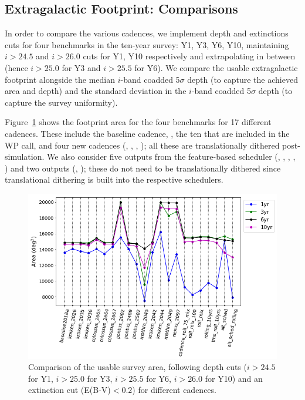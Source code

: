 \subsection{Extragalactic Footprint: Comparisons}
In order to compare the various cadences, we implement depth and extinctions cuts for four benchmarks in the ten-year survey: Y1, Y3, Y6, Y10, maintaining $i>24.5$ and $i>26.0$ cuts for Y1, Y10 respectively and extrapolating in between (hence $i>25.0$  for Y3 and $i>25.5$ for Y6). We compare the usable extragalactic footprint alongside the median $i$-band coadded 5$\sigma$ depth (to capture the achieved area and depth) and the standard deviation in the $i$-band coadded 5$\sigma$ depth (to capture the survey uniformity).

Figure~\ref{fig: compare_area} shows the footprint area for the four benchmarks for 17 different cadences. These include the baseline cadence, , the ten that are included in the WP call, and four new cadences (, , , ); all these are translationally dithered post- simulation. We also consider five outputs from the feature-based scheduler (, , , , ) and two  outputs (, ); these do not need to be translationally dithered since translational dithering is built into the respective schedulers.

\begin{figure}[H]
	\vspace*{2em}
	\centering\includegraphics[width=0.5\paperwidth,trim={30 40 40 40},clip=false]{figures/lss_compare_area_22dbs.png}
	\vspace*{1em}
	\caption{Comparison of the usable survey area, following depth cuts ($i>24.5$ for Y1, $i>25.0$ for Y3, $i>25.5$ for Y6, $i>26.0$ for Y10) and an extinction cut (E(B-V)$<0.2$) for different cadences.}
	\label{fig: compare_area}
\end{figure}

